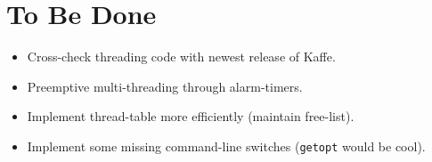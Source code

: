 \documentclass[twocolumn,a4paper]{article}      %
\begin{document}
\section{To Be Done}

\begin{itemize}

\item Cross-check threading code with newest release of Kaffe.

\item Preemptive multi-threading through alarm-timers.

\item Implement thread-table more efficiently (maintain free-list).

\item Implement some missing command-line switches (\texttt{getopt} would be cool).

\end{itemize}
\end{document}
